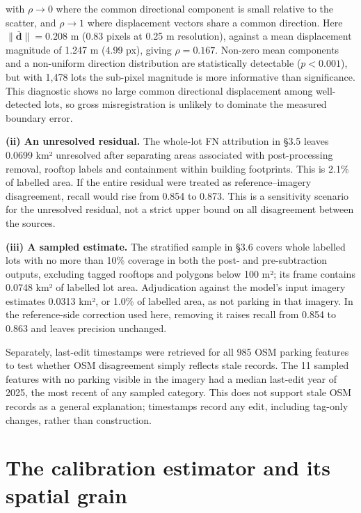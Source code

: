 with \(\rho \to 0\) where the common directional component is small relative to the scatter, and \(\rho \to 1\) where displacement vectors share a common direction. Here \(\lVert\bar{\mathbf{d}}\rVert = 0.208\) m (0.83 pixels at 0.25 m resolution), against a mean displacement magnitude of 1.247 m (4.99 px), giving \(\rho = 0.167\). Non-zero mean components and a non-uniform direction distribution are statistically detectable (\(p < 0.001\)), but with 1,478 lots the sub-pixel magnitude is more informative than significance. This diagnostic shows no large common directional displacement among well-detected lots, so gross misregistration is unlikely to dominate the measured boundary error.

\textbf{(ii) An unresolved residual.} The whole-lot FN attribution in §3.5 leaves 0.0699 km² unresolved after separating areas associated with post-processing removal, rooftop labels and containment within building footprints. This is 2.1\% of labelled area. If the entire residual were treated as reference--imagery disagreement, recall would rise from 0.854 to 0.873. This is a sensitivity scenario for the unresolved residual, not a strict upper bound on all disagreement between the sources.

\textbf{(iii) A sampled estimate.} The stratified sample in §3.6 covers whole labelled lots with no more than 10\% coverage in both the post- and pre-subtraction outputs, excluding tagged rooftops and polygons below 100 m²; its frame contains 0.0748 km² of labelled lot area. Adjudication against the model's input imagery estimates 0.0313 km², or 1.0\% of labelled area, as not parking in that imagery. In the reference-side correction used here, removing it raises recall from 0.854 to 0.863 and leaves precision unchanged.

Separately, last-edit timestamps were retrieved for all 985 OSM parking features to test whether OSM disagreement simply reflects stale records. The 11 sampled features with no parking visible in the imagery had a median last-edit year of 2025, the most recent of any sampled category. This does not support stale OSM records as a general explanation; timestamps record any edit, including tag-only changes, rather than construction.

\hypertarget{the-calibration-estimator-and-its-spatial-grain}{%
\section{The calibration estimator and its spatial grain}\label{the-calibration-estimator-and-its-spatial-grain}}

